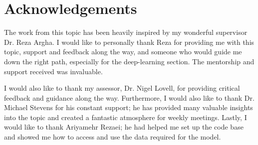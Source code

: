 \chapter*{Acknowledgements}\label{ack}

The work from this topic has been heavily inspired by my wonderful supervisor Dr. Reza Argha. I would like to personally thank Reza for providing me with this topic, support and feedback along the way, and someone who would guide me down the right path, especially for the deep-learning section. The mentorship and support received was invaluable.  

I would also like to thank my assessor, Dr. Nigel Lovell, for providing critical feedback and guidance along the way. Furthermore, I would also like to thank Dr. Michael Stevens for his constant support; he has provided many valuable insights into the topic and created a fantastic atmosphere for weekly meetings. Lastly, I would like to thank Ariyamehr Rezaei; he had helped me set up the code base and showed me how to access and use the data required for the model.
